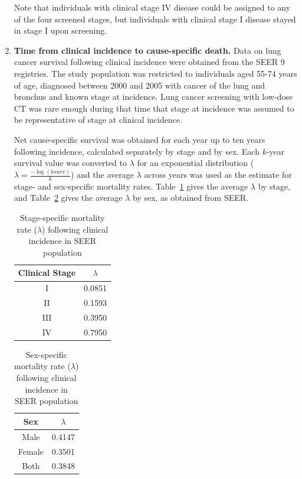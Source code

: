 \documentclass[11pt]{article}
\begin{document}
\begin{enumerate}
    Note that individuals with clinical stage IV disease could be assigned to any of the four screened stages, but individuals with clinical stage I disease stayed in stage I upon screening.

    \item \textbf{Time from clinical incidence to cause-specific death.} Data on lung cancer survival following clinical incidence were obtained from the SEER 9 registries. 
        The study population was restricted to individuals aged 55-74 years of age, diagnosed between 2000 and 2005 with cancer of the lung and bronchus and known stage at incidence. 
        Lung cancer screening with low-dose CT was rare enough during that time that stage at incidence was assumed to be representative of stage at clinical incidence.

        Net cause-specific survival was obtained for each year up to ten years following incidence, calculated separately by stage and by sex. 
        Each $k$-year survival value was converted to $\lambda$ for an exponential distribution ($\lambda=\frac{-\log(ksurv)}{k}$) and the average $\lambda$ across years was used as the estimate for stage- and sex-specific mortality rates. 
        Table~\ref{tab:mortratestg} gives the average $\lambda$ by stage, and Table~\ref{tab:mortratesex} gives the average $\lambda$ by sex, as obtained from SEER. 
        
        \begin{table}
            \centering
            \begin{tabular}{cc}
                Clinical Stage & $\lambda$ \\
                \hline
                I & 0.0851 \\
                II & 0.1593 \\
                III & 0.3950 \\
                IV & 0.7950
            \end{tabular}
            \caption{Stage-specific mortality rate ($\lambda$) following clinical incidence in SEER population}
            \label{tab:mortratestg}
        \end{table}

        \begin{table}
            \centering
            \begin{tabular}{cc}
                Sex & $\lambda$ \\
                \hline
                Male & 0.4147 \\
                Female & 0.3501 \\
                Both & 0.3848
            \end{tabular}
            \caption{Sex-specific mortality rate ($\lambda$) following clinical incidence in SEER population}
            \label{tab:mortratesex}
        \end{table}
        

\end{enumerate}
\end{document}
